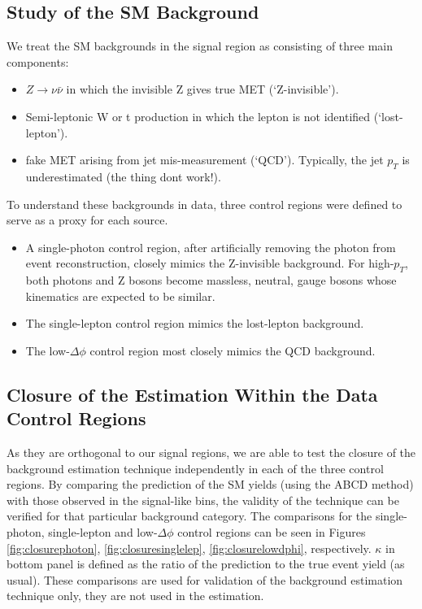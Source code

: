 \subsection{Study of the SM Background}

We treat the SM backgrounds in the signal region as consisting of three main components:
\begin{itemize}
\item $Z\rightarrow\nu\bar{\nu}$ in which the invisible Z gives true MET (`Z-invisible').
\item Semi-leptonic W or t production in which the lepton is not identified (`lost-lepton').
\item fake MET arising from jet mis-measurement (`QCD'). Typically, the jet $p_{T}$ is underestimated (the thing dont work!).
\end{itemize}

To understand these backgrounds in data, three control regions were defined to serve as a proxy for each source.
\begin{itemize}
\item A single-photon control region, after artificially removing the photon from event reconstruction, closely mimics the Z-invisible background. For high-$p_{T}$, both photons and Z bosons become massless, neutral, gauge bosons whose kinematics are expected to be similar.
\item The single-lepton control region mimics the lost-lepton background.
\item The low-$\Delta\phi$ control region most closely mimics the QCD background.
\end{itemize}

\subsection{Closure of the Estimation Within the Data Control Regions}

As they are orthogonal to our signal regions, we are able to test the closure of the background estimation technique independently in each of the three control regions. By comparing the prediction of the SM yields (using the ABCD method) with those observed in the signal-like bins, the validity of the technique can be verified for that particular background category. The comparisons for the single-photon, single-lepton and low-$\Delta\phi$ control regions can be seen in Figures \ref{fig:closurephoton}, \ref{fig:closuresinglelep}, \ref{fig:closurelowdphi}, respectively. $\kappa$ in bottom panel is defined as the ratio of the prediction to the true event yield (as usual). These comparisons are used for validation of the background estimation technique only, they are not used in the estimation.

